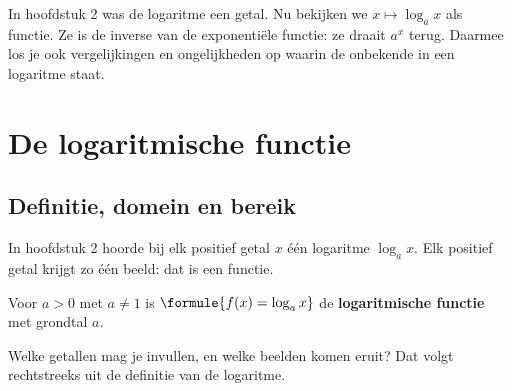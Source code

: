 %



In hoofdstuk 2 was de logaritme een getal. Nu bekijken we $x \mapsto \log_a x$ als functie. Ze is de inverse van de exponentiële functie: ze draait $a^x$ terug. Daarmee los je ook vergelijkingen en ongelijkheden op waarin de onbekende in een logaritme staat.

\begin{oefeningen}[Start]

\end{oefeningen}

\section{De logaritmische functie}

\subsection{Definitie, domein en bereik}

In hoofdstuk 2 hoorde bij elk positief getal $x$ één logaritme $\log_a x$. Elk positief getal krijgt zo één beeld: dat is een functie.

\begin{theorie}
Voor $a > 0$ met $a \neq 1$ is $\formule{f(x) = \log_a x}$ de \textbf{\textcolor{accent}{logaritmische functie}} met grondtal $a$.
\end{theorie}

Welke getallen mag je invullen, en welke beelden komen eruit? Dat volgt rechtstreeks uit de definitie van de logaritme.

